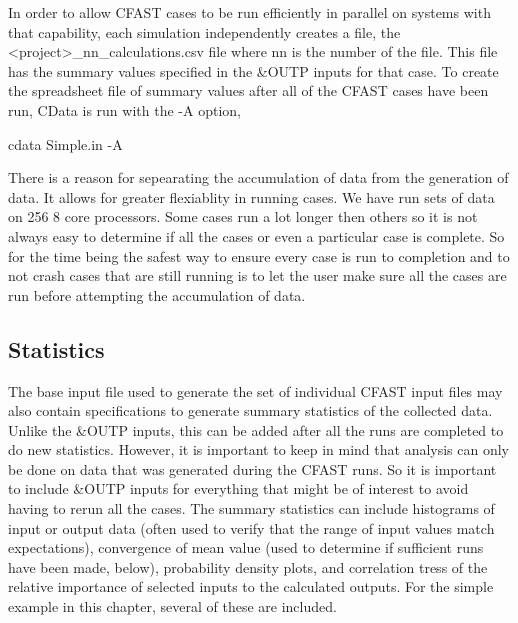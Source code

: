 \documentclass[12pt,twoside]{book}
\begin{document}
In order to allow CFAST cases to be run efficiently in parallel on systems with that capability, each simulation independently creates a file, the {\ct <project>\_nn\_calculations.csv} file where {\ct nn} is the number of the file. This file has the summary values specified in the {\ct \&OUTP} inputs for that case. To create the spreadsheet file of summary values after all of the CFAST cases have been run, CData is run with the {\ct -A} option,

\vspace{\baselineskip}
{\ct cdata Simple.in -A}

There is a reason for sepearating the accumulation of data from the generation of data. It allows for greater flexiablity in running cases. We have run sets of data on 256 8 core processors. Some cases run a lot longer then others so it is not always easy to determine if all the cases or even a particular case is complete. So for the time being the safest way to ensure every case is run to completion and to not crash cases that are still running is to let the user make sure all the cases are run before attempting the accumulation of data. 

\subsection{Statistics}

The base input file used to generate the set of individual CFAST input files may also contain specifications to generate summary statistics of the collected data. Unlike the {\ct \&OUTP} inputs, this can be added after all the runs are completed to do new statistics. However, it is important to keep in mind that analysis can only be done on data that was generated during the CFAST runs. So it is important to include {\ct \&OUTP} inputs for everything that might be of interest to avoid having to rerun all the cases. The summary statistics can include histograms of input or output data (often used to verify that the range of input values match expectations), convergence of mean value (used to determine if sufficient runs have been made, below), probability density plots, and correlation tress of the relative importance of selected inputs to the calculated outputs. For the simple example in this chapter, several of these are included.
\end{document}

